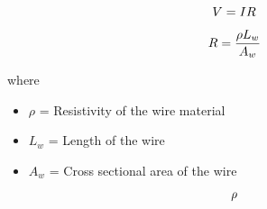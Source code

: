 \documentclass{article}
\begin{document}
\begin{equation}
\Huge {V} = {I}{R}
\end{equation}

\vspace{0.5cm} %
\begin{equation}
\Huge R = \frac{\rho L_w}{A_w}
\end{equation}

\vspace{0.5cm} %


\huge
where
\begin{itemize}
   \item \( \rho \) = Resistivity of the wire material
    \item \( L_w \) = Length of the wire
    \item \( A_w\) = Cross sectional area of the wire
\end{itemize}

\vspace{0.5cm} %
\begin{equation}
\huge \rho
\end {equation}
\end{document}

